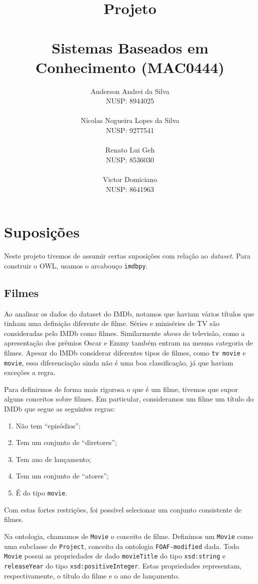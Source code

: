 \documentclass{article}
\title{\Huge Projeto\\~\\\LARGE Sistemas Baseados em Conhecimento (MAC0444)}
\date{}
\author{\Large{Anderson Andrei da Silva}\\\large{NUSP\@: 8944025}\\\\\Large{Nícolas Nogueira Lopes da Silva}\\\large{NUSP\@: 9277541}\\\\\Large{Renato Lui Geh}\\\large{NUSP\@: 8536030}\\\\\Large{Victor Domiciano}\\\large{NUSP\@: 8641963}\\}
\newcommand{\code}[1]{\lstinline[mathescape=true]{#1}}
\begin{document}
\maketitle
\newpage

\section{Suposições}

Neste projeto tivemos de assumir certas suposições com relação ao \textit{dataset}. Para construir
o OWL, usamos o arcabouço \code{imdbpy}.

\subsection{Filmes}

Ao analisar os dados do dataset do IMDb, notamos que haviam vários títulos que tinham uma definição
diferente de filme. Séries e miniséries de TV são consideradas pelo IMDb como filmes. Similarmente
\textit{shows} de televisão, como a apresentação dos prêmios Oscar e Emmy também entram na mesma
categoria de filmes. Apesar do IMDb considerar diferentes tipos de filmes, como \code{tv movie} e
\code{movie}, essa diferenciação ainda não é uma boa classificação, já que haviam exceções a regra.

Para definirmos de forma mais rigorosa o que é um filme, tivemos que supor alguns conceitos sobre
filmes. Em particular, consideramos um filme um título do IMDb que segue as seguintes regras:

\begin{enumerate}
  \item Não tem ``episódios'';
  \item Tem um conjunto de ``diretores'';
  \item Tem ano de lançamento;
  \item Tem um conjunto de ``atores'';
  \item É do tipo \code{movie}.
\end{enumerate}

Com estas fortes restrições, foi possível selecionar um conjunto consistente de filmes.

Na ontologia, chamamos de \code{Movie} o conceito de filme. Definimos um \code{Movie} como uma
subclasse de \code{Project}, conceito da ontologia \code{FOAF-modified} dada. Todo \code{Movie}
possui as propriedades de dado \code{movieTitle} do tipo \code{xsd:string} e \code{releaseYear} do
tipo \code{xsd:positiveInteger}. Estas propriedades representam, respectivamente, o título do
filme e o ano de lançamento.
\end{document}
